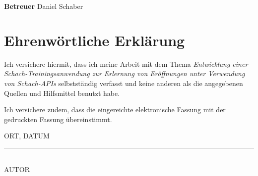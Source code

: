 \documentclass[
	pdftex,
	oneside,  
	12pt,			   	 %
	parskip=half,		 %
	headheight = 12pt,    	%
	headsepline,		    	%
	footheight = 16pt,	    	%
	footsepline,		   	 %
	abstract=true,		%
	DIV=calc,		    	%
	BCOR=8mm,		    	%
	headinclude=false,   	%
	footinclude=false,	    	%
	listof=totoc,		    	%
	toc=bibliography,	    	%
]{scrreprt}	                    		 %
\newcommand{\chapterMargin}{20pt}
\begin{document}
\begin{spacing}{1}
\begin{titlepage}
\begin{spacing}{1.2}
\begin{tabbing}

		\textbf{Betreuer}              \>   Daniel Schaber\\
	\end{tabbing}
	\end{spacing}
\end{titlepage}
\end{spacing}

\newpage



\thispagestyle{empty}

\section*{Ehrenwörtliche Erklärung}
\vspace*{2em}
Ich versichere hiermit, dass ich meine Arbeit mit dem Thema \emph{Entwicklung einer Schach-Trainingsanwendung zur Erlernung von Eröffnungen unter Verwendung von Schach-APIs} selbstständig verfasst und keine anderen
als die angegebenen Quellen und Hilfsmittel benutzt habe.

Ich versichere zudem, dass die eingereichte elektronische Fassung mit der gedruckten Fassung
übereinstimmt.

\vspace{3em}

ORT, DATUM

\vspace{4em}

\rule{6cm}{0.4pt}\\
AUTOR

\newpage

\newpage

\pagestyle{plain}
	
\RedeclareSectionCommand[beforeskip=\chapterMargin]{chapter}
\end{document}
